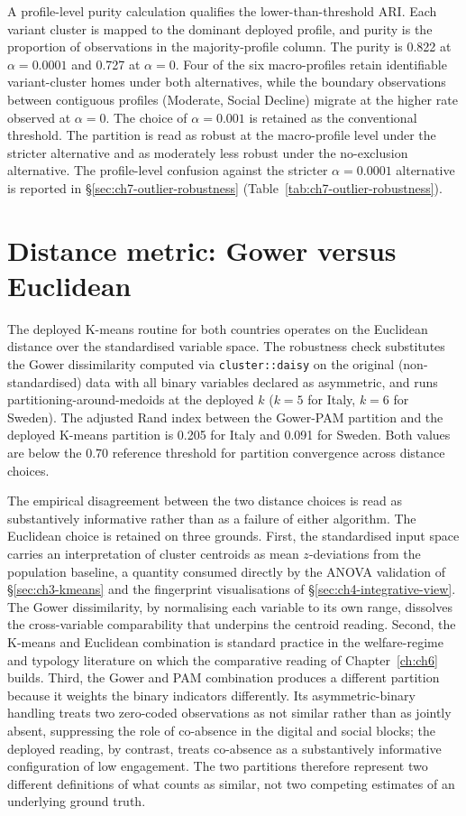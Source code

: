 A profile-level purity calculation qualifies the lower-than-threshold ARI. Each variant cluster is mapped to the dominant deployed profile, and purity is the proportion of observations in the majority-profile column. The purity is 0.822 at $\alpha = 0.0001$ and 0.727 at $\alpha = 0$. Four of the six macro-profiles retain identifiable variant-cluster homes under both alternatives, while the boundary observations between contiguous profiles (Moderate, Social Decline) migrate at the higher rate observed at $\alpha = 0$. The choice of $\alpha = 0.001$ is retained as the conventional threshold. The partition is read as robust at the macro-profile level under the stricter alternative and as moderately less robust under the no-exclusion alternative. The profile-level confusion against the stricter $\alpha = 0.0001$ alternative is reported in \S\ref{sec:ch7-outlier-robustness} (Table~\ref{tab:ch7-outlier-robustness}).


\section{Distance metric: Gower versus Euclidean}
\label{sec:appx-sens-gower}

The deployed K-means routine for both countries operates on the Euclidean distance over the standardised variable space. The robustness check substitutes the Gower dissimilarity computed via \texttt{cluster::daisy} on the original (non-standardised) data with all binary variables declared as asymmetric, and runs partitioning-around-medoids at the deployed $k$ ($k = 5$ for Italy, $k = 6$ for Sweden). The adjusted Rand index between the Gower-PAM partition and the deployed K-means partition is 0.205 for Italy and 0.091 for Sweden. Both values are below the 0.70 reference threshold for partition convergence across distance choices.

The empirical disagreement between the two distance choices is read as substantively informative rather than as a failure of either algorithm. The Euclidean choice is retained on three grounds. First, the standardised input space carries an interpretation of cluster centroids as mean $z$-deviations from the population baseline, a quantity consumed directly by the ANOVA validation of \S\ref{sec:ch3-kmeans} and the fingerprint visualisations of \S\ref{sec:ch4-integrative-view}. The Gower dissimilarity, by normalising each variable to its own range, dissolves the cross-variable comparability that underpins the centroid reading. Second, the K-means and Euclidean combination is standard practice in the welfare-regime and typology literature on which the comparative reading of Chapter~\ref{ch:ch6} builds. Third, the Gower and PAM combination produces a different partition because it weights the binary indicators differently. Its asymmetric-binary handling treats two zero-coded observations as not similar rather than as jointly absent, suppressing the role of co-absence in the digital and social blocks; the deployed reading, by contrast, treats co-absence as a substantively informative configuration of low engagement. The two partitions therefore represent two different definitions of what counts as similar, not two competing estimates of an underlying ground truth.

